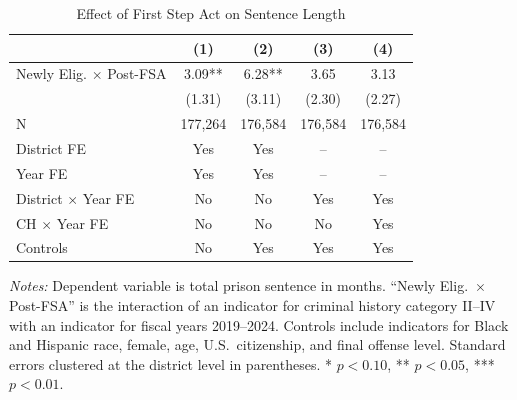 \begin{table}[H]
\centering
\caption{Effect of First Step Act on Sentence Length}
\label{tab:main}
\begin{threeparttable}
\begin{tabular}{lcccc}
\toprule
 & (1) & (2) & (3) & (4) \\
\midrule
Newly Elig. $\times$ Post-FSA & 3.09** & 6.28** & 3.65 & 3.13 \\
 & (1.31) & (3.11) & (2.30) & (2.27) \\
\midrule
N & 177,264 & 176,584 & 176,584 & 176,584 \\
District FE & Yes & Yes & -- & -- \\
Year FE & Yes & Yes & -- & -- \\
District $\times$ Year FE & No & No & Yes & Yes \\
CH $\times$ Year FE & No & No & No & Yes \\
Controls & No & Yes & Yes & Yes \\
\bottomrule
\end{tabular}
\begin{tablenotes}[flushleft]
\small
\item \textit{Notes:} Dependent variable is total prison sentence in months. ``Newly Elig.\ $\times$ Post-FSA'' is the interaction of an indicator for criminal history category II--IV with an indicator for fiscal years 2019--2024. Controls include indicators for Black and Hispanic race, female, age, U.S.\ citizenship, and final offense level. Standard errors clustered at the district level in parentheses. * $p<0.10$, ** $p<0.05$, *** $p<0.01$.
\end{tablenotes}
\end{threeparttable}
\end{table}
